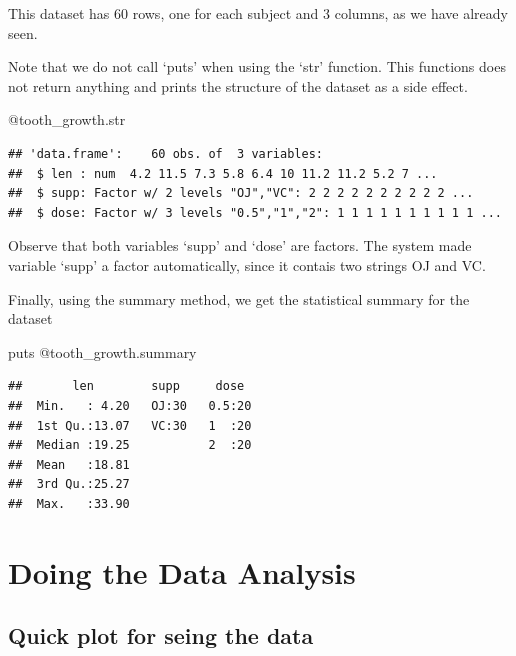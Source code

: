 \documentclass[11pt,]{article}
\newenvironment{Shaded}{\begin{snugshade}}{\end{snugshade}}
\newcommand{\OtherTok}[1]{\textcolor[rgb]{0.56,0.35,0.01}{#1}}
\newcommand{\NormalTok}[1]{#1}
\begin{document}
This dataset has 60 rows, one for each subject and 3 columns, as we have
already seen.

Note that we do not call `puts' when using the `str' function. This
functions does not return anything and prints the structure of the
dataset as a side effect.

\begin{Shaded}
\begin{Highlighting}[]
\OtherTok{@tooth_growth}\NormalTok{.str}
\end{Highlighting}
\end{Shaded}

\begin{verbatim}
## 'data.frame':    60 obs. of  3 variables:
##  $ len : num  4.2 11.5 7.3 5.8 6.4 10 11.2 11.2 5.2 7 ...
##  $ supp: Factor w/ 2 levels "OJ","VC": 2 2 2 2 2 2 2 2 2 2 ...
##  $ dose: Factor w/ 3 levels "0.5","1","2": 1 1 1 1 1 1 1 1 1 1 ...
\end{verbatim}

Observe that both variables `supp' and `dose' are factors. The system
made variable `supp' a factor automatically, since it contais two
strings OJ and VC.

Finally, using the summary method, we get the statistical summary for
the dataset

\begin{Shaded}
\begin{Highlighting}[]
\NormalTok{puts }\OtherTok{@tooth_growth}\NormalTok{.summary}
\end{Highlighting}
\end{Shaded}

\begin{verbatim}
##       len        supp     dose   
##  Min.   : 4.20   OJ:30   0.5:20  
##  1st Qu.:13.07   VC:30   1  :20  
##  Median :19.25           2  :20  
##  Mean   :18.81                   
##  3rd Qu.:25.27                   
##  Max.   :33.90
\end{verbatim}

\section{Doing the Data Analysis}\label{doing-the-data-analysis}

\subsection{Quick plot for seing the
data}\label{quick-plot-for-seing-the-data}
\end{document}
